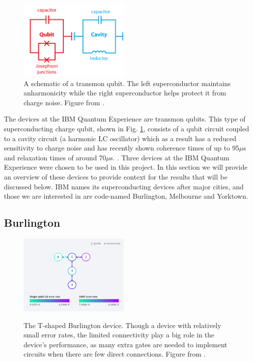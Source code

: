 \begin{figure}[h]
  \includegraphics[width=0.48\textwidth]{images/transmon_diagram.png}
  \caption{A schematic of a transmon qubit. The left superconductor maintains
    anharmonicity while the right superconductor helps protect it from charge
    noise. Figure from \cite{dickel20_how_to_make_artif_atoms}.}
  \label{fig:transmon}
\end{figure}

The devices at the IBM Quantum Experience are transmon qubits. This type of
superconducting charge qubit, shown in Fig. \ref{fig:transmon}, consists of a qubit
circuit coupled to a cavity circuit (a harmonic LC oscillator) which as a result
has a reduced sensitivity to
charge noise and has recently shown coherence times of up to 95$\mu$s and
relaxation times of around 70$\mu$s.
\cite{rigetti12_super_qubit_waveg_cavit_with}. Three devices at the IBM Quantum
Experience were chosen to be used in this project. In this section we will
provide an overview of these devices to provide context for the results that
will be discussed below. IBM names its superconducting devices after major
cities, and those we are interested in are code-named Burlington, Melbourne and
Yorktown.

\subsection{Burlington}


\begin{figure}[h]
  \includegraphics[width=0.48\textwidth]{images/connection_diagram_burlington.png}
  \label{burlington_connections}
  \caption{The T-shaped Burlington device. Though a device with relatively small
    error rates, the limited connectivity play a big role in the device's
    performance, as many extra gates are needed to implement circuits when there
    are few direct connections. Figure from \cite{ibmq_burlington}.}
\end{figure}

